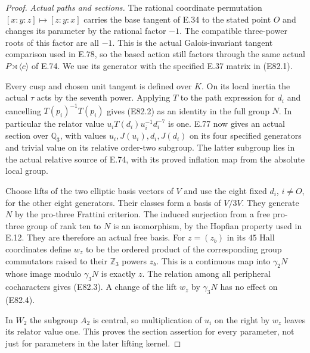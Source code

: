 \begin{proof}
\emph{Actual paths and sections.}
The rational coordinate permutation
$[x:y:z]\mapsto[z:y:x]$ carries the base tangent of
E.34 to the stated point $O$ and changes its parameter
by the rational factor $-1$. The compatible three-power
roots of this factor are all $-1$. This is the actual
Galois-invariant tangent comparison used in E.78, so the
based action still factors through the same actual
$P\rtimes\langle c\rangle$ of E.74.
We use its generator with the specified E.37 matrix in
(E82.1).

Every cusp and chosen unit tangent is defined over $K$.
On its local inertia the actual $\tau$ acts by the seventh
power. Applying $T$ to the path expression for $d_i$ and
cancelling $T(p_i)^{-1}T(p_i)$ gives (E82.2) as an identity
in the full group $N$. In particular the relator value
$u_iT(d_i)u_i^{-1}d_i^{-7}$ is one. E.77 now gives an
actual section over $\mathbb Q_3$, with values
$u_i,J(u_i),d_i,J(d_i)$ on its four specified generators
and trivial value on its relative order-two subgroup.
The latter subgroup lies in the actual relative source
of E.74, with its proved inflation map from the absolute
local group.

Choose lifts of the two elliptic basis vectors of $V$
and use the eight fixed $d_i$, $i\ne O$, for the other
eight generators. Their classes form a basis of $V/3V$.
They generate $N$ by the pro-three Frattini criterion.
The induced surjection from a free pro-three group of
rank ten to $N$ is an isomorphism, by the Hopfian property
used in E.12. They are therefore an actual free basis.
For $z=(z_b)$ in its $45$ Hall coordinates define $w_z$
to be the ordered product of the corresponding group
commutators raised to their $\mathbb Z_3$ powers $z_b$.
This is a continuous map into $\gamma_2N$ whose image
modulo $\gamma_3N$ is exactly $z$.
The relation among all peripheral cocharacters gives
(E82.3). A change of the lift $w_z$ by $\gamma_3N$ has
no effect on (E82.4).

In $W_2$ the subgroup $A_2$ is central, so multiplication
of $u_i$ on the right by $w_z$ leaves its relator value
one. This proves the section assertion for every parameter,
not just for parameters in the later lifting kernel.


\end{proof}
